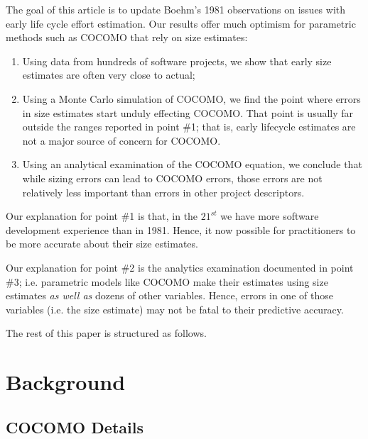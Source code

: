 \documentclass[final,twocolumn,5p]{elsarticle}
\newcommand{\be}{\begin{enumerate}}
\newcommand{\ee}{\end{enumerate}}
\begin{document}
The goal of this article is to update Boehm's 1981 observations on issues
with early life cycle effort estimation. Our results offer much optimism for
parametric methods such as COCOMO that rely on size estimates:
\be
\item
  Using data from hundreds of software projects, we show that
  early size estimates are often  very close to actual;
\item
  Using a Monte Carlo simulation of COCOMO, we find the point where
  errors in size estimates start unduly effecting COCOMO. That point
  is usually far outside the ranges reported in point \#1; that is, early lifecycle estimates
  are not  a major source of concern for COCOMO.
  \item
  Using an analytical examination of the COCOMO equation, we conclude that
  while sizing errors can lead to COCOMO errors, those errors are not relatively less
  important than errors in other project descriptors.
  \ee
  Our explanation for point \#1 is that, in the
  $21^{st}$ we have more software development
  experience than in 1981.  Hence, it now possible
  for practitioners to be more accurate about their
  size estimates.

  Our explanation for point \#2 is the analytics
  examination documented in point \#3;
  i.e. parametric models like COCOMO make their
  estimates using size estimates {\em as well as}
  dozens of other variables.  Hence, errors in one
  of those variables (i.e. the size estimate) may
  not be fatal to their predictive accuracy.

The rest of this paper is structured as follows.  


\section{Background}


  
  \subsection{COCOMO Details}
  
\end{document}
